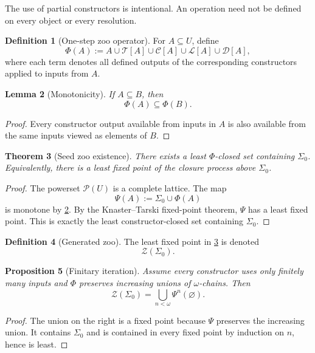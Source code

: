 \documentclass[11pt]{article}
\newtheorem{theorem}{Theorem}[section]
\newtheorem{proposition}[theorem]{Proposition}
\newtheorem{lemma}[theorem]{Lemma}
\theoremstyle{definition}
\newtheorem{definition}[theorem]{Definition}
\theoremstyle{remark}
\newcommand{\Zoo}{\mathcal Z}
\newcommand{\Seeds}{\Sigma}
\begin{document}
The use of partial constructors is intentional. An operation need not be defined on every object or every resolution.

\begin{definition}[One-step zoo operator]
For $A\subseteq U$, define
\[
\Phi(A):=
A
\cup \mathscr T[A]
\cup \mathscr C[A]
\cup \mathscr L[A]
\cup \mathscr D[A],
\]
where each term denotes all defined outputs of the corresponding constructors applied to inputs from $A$.
\end{definition}

\begin{lemma}[Monotonicity]\label{lem:phi-monotone}
If $A\subseteq B$, then
\[
\Phi(A)\subseteq\Phi(B).
\]
\end{lemma}

\begin{proof}
Every constructor output available from inputs in $A$ is also available from the same inputs viewed as elements of $B$.
\end{proof}

\begin{theorem}[Seed zoo existence]\label{thm:zoo-existence}
There exists a least $\Phi$-closed set containing $\Seeds_0$. Equivalently, there is a least fixed point of the closure process above $\Seeds_0$.
\end{theorem}

\begin{proof}
The powerset $\mathcal P(U)$ is a complete lattice. The map
\[
\Psi(A):=\Seeds_0\cup\Phi(A)
\]
is monotone by \cref{lem:phi-monotone}. By the Knaster--Tarski fixed-point theorem, $\Psi$ has a least fixed point. This is exactly the least constructor-closed set containing $\Seeds_0$.
\end{proof}

\begin{definition}[Generated zoo]
The least fixed point in \cref{thm:zoo-existence} is denoted
\[
\Zoo(\Seeds_0).
\]
\end{definition}

\begin{proposition}[Finitary iteration]\label{prop:finitary}
Assume every constructor uses only finitely many inputs and $\Phi$ preserves increasing unions of $\omega$-chains. Then
\[
\Zoo(\Seeds_0)
=
\bigcup_{n<\omega}\Psi^n(\varnothing).
\]
\end{proposition}

\begin{proof}
The union on the right is a fixed point because $\Psi$ preserves the increasing union. It contains $\Seeds_0$ and is contained in every fixed point by induction on $n$, hence is least.
\end{proof}
\end{document}

